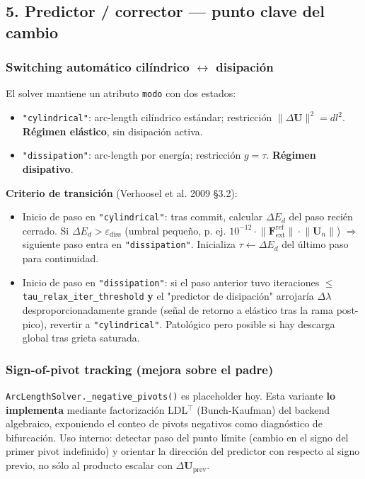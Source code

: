 \documentclass[11pt,letterpaper,oneside]{report}
\begin{document}
\subsection{5. Predictor / corrector --- punto clave del cambio}

\subsubsection{Switching automático cilíndrico \ensuremath{\leftrightarrow} disipación}

El solver mantiene un atributo \texttt{modo} con dos estados:

\begin{itemize}
  \item \texttt{"cylindrical"}: arc-length cilíndrico estándar; restricción $\lVert\Delta\mathbf U\rVert^2 = dl^2$. \textbf{Régimen elástico}, sin disipación activa.
  \item \texttt{"dissipation"}: arc-length por energía; restricción $g = \tau$. \textbf{Régimen disipativo}.
\end{itemize}

\textbf{Criterio de transición} (Verhoosel et al. 2009 §3.2):

\begin{itemize}
  \item Inicio de paso en \texttt{"cylindrical"}: tras commit, calcular $\Delta E_d$ del paso recién cerrado. Si $\Delta E_d > \varepsilon_{\text{diss}}$ (umbral pequeño, p. ej. $10^{-12}\cdot \lVert\mathbf F_{\text{ext}}^{\text{ref}}\rVert\cdot \lVert\mathbf U_n\rVert$) \ensuremath{\Rightarrow} siguiente paso entra en \texttt{"dissipation"}. Inicializa $\tau \leftarrow \Delta E_d$ del último paso para continuidad.
  \item Inicio de paso en \texttt{"dissipation"}: si el paso anterior tuvo iteraciones $\le$ \texttt{tau\_relax\_iter\_threshold} \textbf{y} el "predictor de disipación" arrojaría $\Delta\lambda$ desproporcionadamente grande (señal de retorno a elástico tras la rama post-pico), revertir a \texttt{"cylindrical"}. Patológico pero posible si hay descarga global tras grieta saturada.
\end{itemize}

\subsubsection{Sign-of-pivot tracking (mejora sobre el padre)}

\texttt{ArcLengthSolver.\_negative\_pivots()} es placeholder hoy. Esta variante \textbf{lo implementa} mediante factorización LDL\ensuremath{^{\top}} (Bunch-Kaufman) del backend algebraico, exponiendo el conteo de pivots negativos como diagnóstico de bifurcación. Uso interno: detectar paso del punto límite (cambio en el signo del primer pivot indefinido) y orientar la dirección del predictor con respecto al signo previo, no sólo al producto escalar con $\Delta\mathbf U_{\text{prev}}$.
\end{document}
